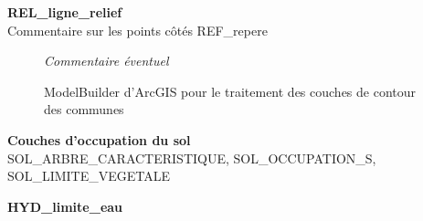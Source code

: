 \documentclass{themeensg}
\begin{document}
\begin{appendices}
\clearpage

\begin{center}
    \Large
    \textbf{REL\_ligne\_relief}\\
    \small 
    Commentaire sur les points côtés REF\_repere
\end{center}


\vspace{1.5cm}

\addtocounter{figure}{-1}
\begin{figure}
\addtocounter{figure}{1}
\centering
{}%
\caption{ModelBuilder d'ArcGIS pour le traitement des couches de contour des communes}%
\textit{Commentaire éventuel}
\end{figure}

\clearpage

\begin{center}
    \Large
    \textbf{Couches d'occupation du sol}\\
    \vspace{0.5cm}
    \small
    SOL\_ARBRE\_CARACTERISTIQUE, SOL\_OCCUPATION\_S, SOL\_LIMITE\_VEGETALE
\end{center}




\clearpage


\begin{center}
    \Large
    \textbf{HYD\_limite\_eau}
\end{center}

\end{appendices}
\end{document}
